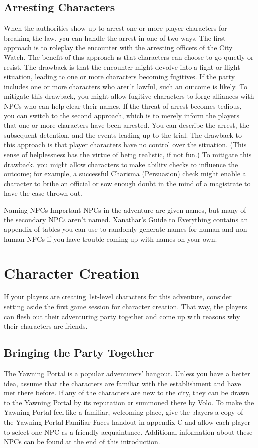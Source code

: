 \documentclass[10pt,a4paper,twoside,twocolumn,openany,nodeprecatedcode]{dndbook}
\begin{document}
\subsection{Arresting Characters}
When the authorities show up to arrest one or more player characters for breaking the law, you can handle the arrest in one of two ways.
The first approach is to roleplay the encounter with the arresting officers of the City Watch. The benefit of this approach is that characters can choose to go quietly or resist. The drawback is that the encounter might devolve into a fight-or-flight situation, leading to one or more characters becoming fugitives. If the party includes one or more characters who aren't lawful, such an outcome is likely. To mitigate this drawback, you might allow fugitive characters to forge alliances with NPCs who can help clear their names.
If the threat of arrest becomes tedious, you can switch to the second approach, which is to merely inform the players that one or more characters have been arrested. You can describe the arrest, the subsequent detention, and the events leading up to the trial. The drawback to this approach is that player characters have no control over the situation. (This sense of helplessness has the virtue of being realistic, if not fun.) To mitigate this drawback, you might allow characters to make ability checks to influence the outcome; for example, a successful Charisma (Persuasion) check might enable a character to bribe an official or sow enough doubt in the mind of a magistrate to have the case thrown out.
\begin{DndComment}{Naming NPCs}
Important NPCs in the adventure are given names, but many of the secondary NPCs aren't named. Xanathar's Guide to Everything contains an appendix of tables you can use to randomly generate names for human and non-human NPCs if you have trouble coming up with names on your own.
\end{DndComment}

\section{Character Creation}
If your players are creating 1st-level characters for this adventure, consider setting aside the first game session for character creation. That way, the players can flesh out their adventuring party together and come up with reasons why their characters are friends.
\subsection{Bringing the Party Together}
The Yawning Portal is a popular adventurers' hangout. Unless you have a better idea, assume that the characters are familiar with the establishment and have met there before. If any of the characters are new to the city, they can be drawn to the Yawning Portal by its reputation or summoned there by Volo.
To make the Yawning Portal feel like a familiar, welcoming place, give the players a copy of the Yawning Portal Familiar Faces handout in appendix C and allow each player to select one NPC as a friendly acquaintance. Additional information about these NPCs can be found at the end of this introduction.
\end{document}
